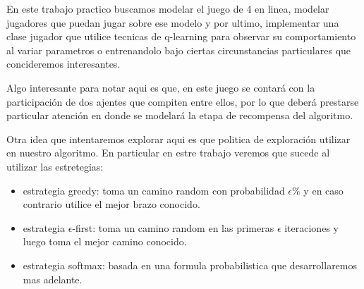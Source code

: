 En este trabajo practico buscamos modelar el juego de 4 en linea, modelar jugadores que puedan jugar sobre ese modelo y por ultimo, implementar una clase jugador que utilice tecnicas de q-learning para observar su comportamiento al variar parametros o entrenandolo bajo ciertas circunstancias particulares que concideremos interesantes.

Algo interesante para notar aqui es que, en este juego se contará con la participación de dos ajentes que compiten entre ellos, por lo que deberá prestarse particular atención en donde se modelará la etapa de recompensa del algoritmo. \completar

Otra idea que intentaremos explorar aqui es que politica de exploración utilizar en nuestro algoritmo. En particular en estre trabajo veremos que sucede al utilizar las estretegias:
\begin{itemize}
\item estrategia greedy: toma un camino random con probabilidad $\epsilon\%$ y en caso contrario utilice el mejor brazo conocido.
\item estrategia $\epsilon$-first: toma un camino random en las primeras $\epsilon$ iteraciones y luego toma el mejor camino conocido.
\item estrategia softmax: basada en una formula probabilistica que desarrollaremos mas adelante.
\end{itemize}

